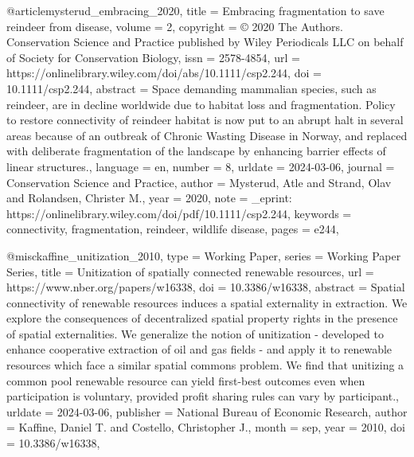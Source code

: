 {{{{@article{mysterud_embracing_2020,
	title = {Embracing fragmentation to save reindeer from disease},
	volume = {2},
	copyright = {© 2020 The Authors. Conservation Science and Practice published by Wiley Periodicals LLC on behalf of Society for Conservation Biology},
	issn = {2578-4854},
	url = {https://onlinelibrary.wiley.com/doi/abs/10.1111/csp2.244},
	doi = {10.1111/csp2.244},
	abstract = {Space demanding mammalian species, such as reindeer, are in decline worldwide due to habitat loss and fragmentation. Policy to restore connectivity of reindeer habitat is now put to an abrupt halt in several areas because of an outbreak of Chronic Wasting Disease in Norway, and replaced with deliberate fragmentation of the landscape by enhancing barrier effects of linear structures.},
	language = {en},
	number = {8},
	urldate = {2024-03-06},
	journal = {Conservation Science and Practice},
	author = {Mysterud, Atle and Strand, Olav and Rolandsen, Christer M.},
	year = {2020},
	note = {\_eprint: https://onlinelibrary.wiley.com/doi/pdf/10.1111/csp2.244},
	keywords = {connectivity, fragmentation, reindeer, wildlife disease},
	pages = {e244},
}

@misc{kaffine_unitization_2010,
	type = {Working {Paper}},
	series = {Working {Paper} {Series}},
	title = {Unitization of spatially connected renewable resources},
	url = {https://www.nber.org/papers/w16338},
	doi = {10.3386/w16338},
	abstract = {Spatial connectivity of renewable resources induces a spatial externality in extraction. We explore the consequences of decentralized spatial property rights in the presence of spatial externalities. We generalize the notion of unitization - developed to enhance cooperative extraction of oil and gas fields - and apply it to renewable resources which face a similar spatial commons problem. We find that unitizing a common pool renewable resource can yield first-best outcomes even when participation is voluntary, provided profit sharing rules can vary by participant.},
	urldate = {2024-03-06},
	publisher = {National Bureau of Economic Research},
	author = {Kaffine, Daniel T. and Costello, Christopher J.},
	month = sep,
	year = {2010},
	doi = {10.3386/w16338},
}

}}}}
